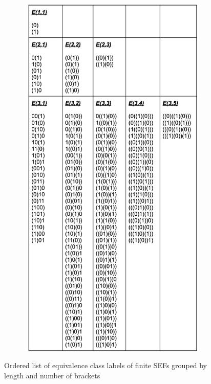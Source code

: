 \begin{appendices}
\begin{figure}[h!]
\begin{subfigure}[b]{0.7\linewidth}
      \includegraphics[width=\linewidth]{appendix/sef-seq.png}
    \end{subfigure}
    \caption{Ordered list of equivalence class labels of finite SEFs grouped by length and number of brackets}
    \label{fig:sefseq}
  \end{figure}


\end{appendices}

